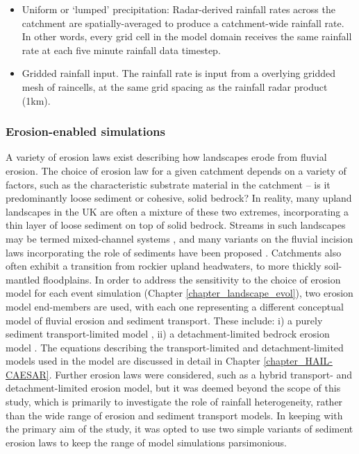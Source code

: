 \begin{itemize}
\item Uniform or `lumped' precipitation: Radar-derived rainfall rates across the catchment are spatially-averaged to produce a catchment-wide rainfall rate. In other words, every grid cell in the model domain receives the same rainfall rate at each five minute rainfall data timestep.
\item Gridded rainfall input. The rainfall rate is input from a overlying gridded mesh of raincells, at the same grid spacing as the rainfall radar product (1km).
\end{itemize}

\subsubsection{Erosion-enabled simulations}
A variety of erosion laws exist describing how landscapes erode from fluvial erosion. The choice of erosion law for a given catchment depends on a variety of factors, such as the characteristic substrate material in the catchment -- is it predominantly loose sediment or cohesive, solid bedrock? In reality, many upland landscapes in the UK are often a mixture of these two extremes, incorporating a thin layer of loose sediment on top of solid bedrock. Streams in such landscapes may be termed mixed-channel systems \citep{howard1998long}, and many variants on the fluvial incision laws incorporating the role of sediments have been proposed \citep{Lague2005,sklar2006role}. Catchments also often exhibit a transition from rockier upland headwaters, to more thickly soil-mantled floodplains. In order to address the sensitivity to the choice of erosion model for each event simulation (Chapter \ref{chapter_landscape_evol}), two erosion model end-members are used, with each one representing a different conceptual model of fluvial erosion and sediment transport. These include: i) a purely sediment transport-limited model \citep{wilcock2003surface}, ii) a detachment-limited bedrock erosion model \citep{howard1983channel,stock1999geologic,whipple1999dynamics}. The equations describing the transport-limited and detachment-limited models used in the model are discussed in detail in Chapter \ref{chapter_HAIL-CAESAR}. Further erosion laws were considered, such as a hybrid transport- and detachment-limited erosion model, but it was deemed beyond the scope of this study, which is primarily to investigate the role of rainfall heterogeneity, rather than the wide range of erosion and sediment transport models. In keeping with the primary aim of the study, it was opted to use two simple variants of sediment erosion laws to keep the range of model simulations parsimonious. 


